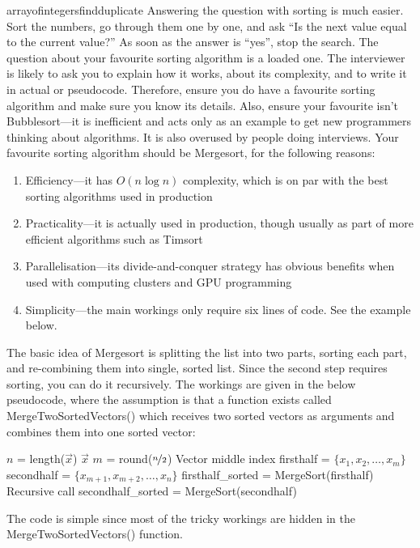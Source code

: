 \begin{answer}{arrayofintegersfindduplicate}
 Answering the question with sorting is much easier.
 Sort the numbers, go through them one by one, and ask ``Is the next value equal to the current value?''
 As soon as the answer is ``yes'', stop the search.
 The question about your favourite sorting algorithm is a loaded one.
 The interviewer is likely to ask you to explain how it works, about its complexity, and to write it in actual or pseudocode.
 Therefore, ensure you do have a favourite sorting algorithm and make sure you know its details.
 Also, ensure your favourite isn't Bubblesort---it is inefficient and acts only as an example to get new programmers thinking about algorithms.
 It is also overused by people doing interviews.
Your favourite sorting algorithm should be Mergesort, for the following reasons:
 \begin{enumerate}
   \item Efficiency---it has $O(n \log n)$ complexity, which is on par with the best sorting algorithms used in production
   \item Practicality---it is actually used in production, though usually as part of more efficient algorithms such as Timsort
   \item Parallelisation---its divide-and-conquer strategy has obvious benefits when used with computing clusters and GPU programming
   \item Simplicity---the main workings only require six lines of code. See the example below.
 \end{enumerate}
The basic idea of Mergesort is splitting the list into two parts, sorting each part, and re-combining them into single, sorted list.
Since the second step requires sorting, you can do it recursively.
The workings are given in the below pseudocode, where the assumption is that a function exists called
MergeTwoSortedVectors()
which receives two sorted vectors as arguments and combines them into one sorted vector:
\begin{algorithmic}[1]
  \Statex
  \State
        $n$ = length($\vec{x}$)
      \State
      \Return $\vec{x}$
     \EndIf
  \State
  $m$ = round($\nicefrac{n}{2}$) \Comment Vector middle index
  \State
  firsthalf = $\{x_1, x_2, \ldots ,x_m\}$
  \State
  secondhalf = $\{x_{m+1}, x_{m+2}, \ldots, x_n \}$
  \State
  firsthalf\_sorted = MergeSort(firsthalf)
  \Comment Recursive call
  \State
  secondhalf\_sorted = MergeSort(secondhalf)
      \State {}
  \EndFunction
\end{algorithmic}
The code is simple since most of the tricky workings are hidden in the MergeTwoSortedVectors() function.


\end{answer}
